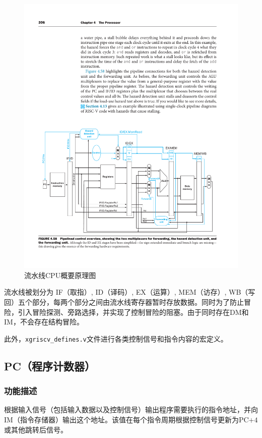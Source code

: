 \documentclass[UTF8,a4paper,autofakebold,15pt]{ctexart}
\begin{document}
\begin{figure}[h]
	\centering
	\includegraphics{fig4.pdf}
	\caption{流水线CPU概要原理图\cite{ref1}}
	\label{fig:label4}
\end{figure}

流水线被划分为 IF（取指）, ID（译码）, EX（运算）, MEM（访存）, WB（写回）五个部分，每两个部分之间由流水线寄存器暂时存放数据。同时为了防止冒险，引入冒险探测、旁路选择，并实现了控制冒险的阻塞。由于同时存在DM和IM，不会存在结构冒险。

此外，{\tt xgriscv\_defines.v}文件进行各类控制信号和指令内容的宏定义。

\subsection{PC（程序计数器）}

\subsubsection{功能描述}

根据输入信号（包括输入数据以及控制信号）输出程序需要执行的指令地址，并向IM（指令存储器）输出这个地址。该值在每个指令周期根据控制信号更新为PC$+4$或其他跳转后信号。
\end{document}
